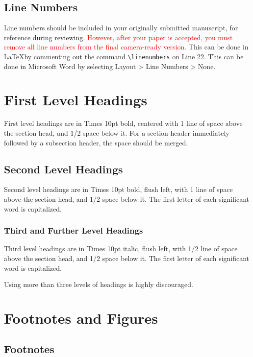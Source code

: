 \documentclass{article}
\begin{document}
\subsection{Line Numbers}

Line numbers should be included in your originally submitted manuscript, for reference during reviewing. \textcolor{red}{However, after your paper is accepted, you must remove all line numbers from the final camera-ready version.} This can be done in \LaTeX by commenting out the command \verb|\linenumbers| on Line 22. This can be done in Microsoft Word by selecting Layout > Line Numbers > None.

\section{First Level Headings}

First level headings are in Times 10pt bold,
centered with 1 line of space above the section head, and 1/2 space below it.
For a section header immediately followed by a subsection header, the space should be merged.

\subsection{Second Level Headings}

Second level headings are in Times 10pt bold, flush left,
with 1 line of space above the section head, and 1/2 space below it.
The first letter of each significant word is capitalized.

\subsubsection{Third and Further Level Headings}

Third level headings are in Times 10pt italic, flush left,
with 1/2 line of space above the section head, and 1/2 space below it.
The first letter of each significant word is capitalized.

Using more than three levels of headings is highly discouraged.

\section{Footnotes and Figures}

\subsection{Footnotes}
\end{document}

